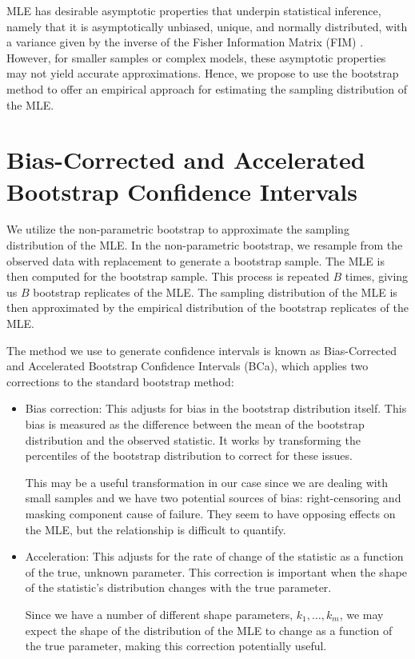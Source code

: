 \documentclass[
]{article}
\begin{document}
MLE has desirable asymptotic properties that underpin statistical
inference, namely that it is asymptotically unbiased, unique, and
normally distributed, with a variance given by the inverse of the Fisher
Information Matrix (FIM) \citep{casella2002statistical}. However, for
smaller samples or complex models, these asymptotic properties may not
yield accurate approximations. Hence, we propose to use the bootstrap
method to offer an empirical approach for estimating the sampling
distribution of the MLE.

\hypertarget{sec:boot}{%
\section{Bias-Corrected and Accelerated Bootstrap Confidence
Intervals}\label{sec:boot}}

We utilize the non-parametric bootstrap to approximate the sampling
distribution of the MLE. In the non-parametric bootstrap, we resample
from the observed data with replacement to generate a bootstrap sample.
The MLE is then computed for the bootstrap sample. This process is
repeated \(B\) times, giving us \(B\) bootstrap replicates of the MLE.
The sampling distribution of the MLE is then approximated by the
empirical distribution of the bootstrap replicates of the MLE.

The method we use to generate confidence intervals is known as
Bias-Corrected and Accelerated Bootstrap Confidence Intervals (BCa),
which applies two corrections to the standard bootstrap method:

\begin{itemize}
\item
  Bias correction: This adjusts for bias in the bootstrap distribution
  itself. This bias is measured as the difference between the mean of
  the bootstrap distribution and the observed statistic. It works by
  transforming the percentiles of the bootstrap distribution to correct
  for these issues.

  This may be a useful transformation in our case since we are dealing
  with small samples and we have two potential sources of bias:
  right-censoring and masking component cause of failure. They seem to
  have opposing effects on the MLE, but the relationship is difficult to
  quantify.
\item
  Acceleration: This adjusts for the rate of change of the statistic as
  a function of the true, unknown parameter. This correction is
  important when the shape of the statistic's distribution changes with
  the true parameter.

  Since we have a number of different shape parameters,
  \(k_1,\ldots,k_m\), we may expect the shape of the distribution of the
  MLE to change as a function of the true parameter, making this
  correction potentially useful.
\end{itemize}
\end{document}
